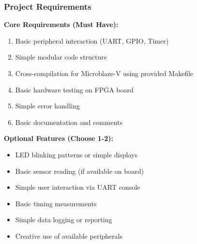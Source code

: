 \documentclass{beamer}
\begin{document}
\begin{frame}
\frametitle{Project Requirements}
\textbf{Core Requirements (Must Have):}
\begin{enumerate}
    \item \footnotesize Basic peripheral interaction (UART, GPIO, Timer)
    \item \footnotesize Simple modular code structure
    \item \footnotesize Cross-compilation for Microblaze-V using provided Makefile
    \item \footnotesize Basic hardware testing on FPGA board
    \item \footnotesize Simple error handling
    \item \footnotesize Basic documentation and comments
\end{enumerate}

\vspace{0.3cm}
\textbf{Optional Features (Choose 1-2):}
\begin{itemize}
    \item \footnotesize LED blinking patterns or simple displays
    \item \footnotesize Basic sensor reading (if available on board)
    \item \footnotesize Simple user interaction via UART console
    \item \footnotesize Basic timing measurements
    \item \footnotesize Simple data logging or reporting
    \item \footnotesize Creative use of available peripherals
\end{itemize}
\end{frame}
\end{document}
